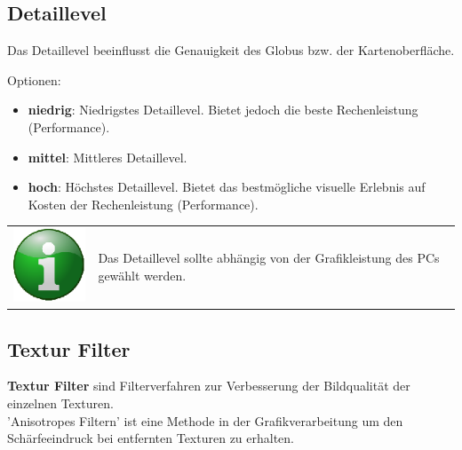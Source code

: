 \documentclass[10pt]{scrreprt}
\begin{document}
\vspace{3mm}
\subsection{Detaillevel}  
Das Detaillevel beeinflusst die Genauigkeit des Globus bzw. der Kartenoberfläche. 

\vspace{3mm}
Optionen:
\begin{itemize}
\item \textbf{niedrig}: Niedrigstes Detaillevel. Bietet jedoch die beste Rechenleistung (Performance).
\item \textbf{mittel}: Mittleres Detaillevel.
\item \textbf{hoch}: Höchstes Detaillevel. Bietet das bestmögliche visuelle Erlebnis auf Kosten der Rechenleistung (Performance).
\end{itemize}

\vspace{3mm}
\begin{tabular}{>{\centering \arraybackslash}m{1cm} m{14cm}}
\includegraphics[scale=0.5]{images/info.eps} & Das Detaillevel sollte abhängig von der Grafikleistung des PCs gewählt werden. \\
\end{tabular}


\newpage
\subsection{Textur Filter}  
\textbf{Textur Filter} sind Filterverfahren zur Verbesserung der Bildqualität der einzelnen Texturen.\\

'Anisotropes Filtern'  ist eine Methode in der Grafikverarbeitung um den Schärfeeindruck bei entfernten Texturen zu erhalten.\\
\end{document}

